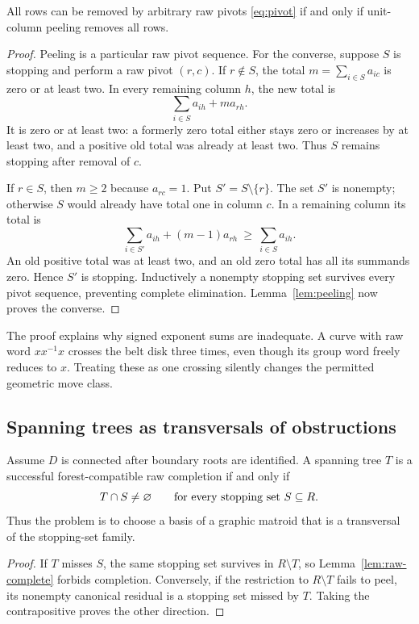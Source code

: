 \begin{lemma}\label{lem:raw-complete}
All rows can be removed by arbitrary raw pivots \eqref{eq:pivot} if and only
if unit-column peeling removes all rows.
\end{lemma}
\begin{proof}
Peeling is a particular raw pivot sequence.  For the converse, suppose
$S$ is stopping and perform a raw pivot $(r,c)$.  If $r\notin S$, the
total $m=\sum_{i\in S}a_{ic}$ is zero or at least two.  In every remaining
column $h$, the new total is
\[
       \sum_{i\in S}a_{ih}+m a_{rh}.
\]
It is zero or at least two: a formerly zero total either stays zero or
increases by at least two, and a positive old total was already at least
two.  Thus $S$ remains stopping after removal of $c$.

If $r\in S$, then $m\geq2$ because $a_{rc}=1$.  Put
$S'=S\setminus\{r\}$.  The set $S'$ is nonempty; otherwise $S$ would
already have total one in column $c$.  In a remaining column its total is
\[
 \sum_{i\in S'}a_{ih}+(m-1)a_{rh}
       \ \geq\ \sum_{i\in S}a_{ih}.
\]
An old positive total was at least two, and an old zero total has all its
summands zero.  Hence $S'$ is stopping.  Inductively a nonempty stopping
set survives every pivot sequence, preventing complete elimination.
Lemma~\ref{lem:peeling} now proves the converse.
\end{proof}

The proof explains why signed exponent sums are inadequate.  A curve with
raw word $x x^{-1}x$ crosses the belt disk three times, even though its
group word freely reduces to $x$.  Treating these as one crossing silently
changes the permitted geometric move class.

\subsection{Spanning trees as transversals of obstructions}
\begin{theorem}\label{thm:transversal}
Assume $D$ is connected after boundary roots are identified.  A spanning
tree $T$ is a successful forest-compatible raw completion if and only if
\begin{equation}\label{eq:hitting}
                   T\cap S\ne\varnothing
       \qquad\hbox{for every stopping set }S\subseteq R.
\end{equation}
Thus the problem is to choose a basis of a graphic matroid that is a
transversal of the stopping-set family.
\end{theorem}
\begin{proof}
If $T$ misses $S$, the same stopping set survives in $R\setminus T$, so
Lemma~\ref{lem:raw-complete} forbids completion.  Conversely, if the
restriction to $R\setminus T$ fails to peel, its nonempty canonical
residual is a stopping set missed by $T$.  Taking the contrapositive proves
the other direction.
\end{proof}

